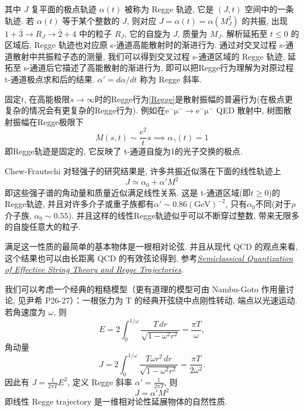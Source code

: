\documentclass[10pt]{article}
\newcounter{ex}[section]\setcounter{ex}{0}
\numberwithin{equation}{section}
\begin{document}
其中 $J$ 复平面的极点轨迹 $\alpha(t)$ 被称为 Regge 轨迹, 它是 $(J,t)$ 空间中的一条轨迹. 若 $\alpha(t)$ 等于某个整数的 $J$, 则对应 $J=\alpha(t)=\alpha(M_{J}^2)$ 的共振, 出现 $1+\bar{3}\longrightarrow R_{J}\longrightarrow \bar{2}+4$ 中的粒子 $R_{J}$, 它的自旋为 $J$, 质量为 $M_{J}$. 解析延拓至 $t\leq 0$ 的区域后, Regge 轨迹也对应原 s-通道高能散射时的渐进行为. 通过对交叉过程 s-通道散射中共振粒子态的测量, 我们可以得到交叉过程 s-通道区域的 Regge 轨迹, 延拓至 s-通道后它描述了高能散射的渐进行为, 即可以把Regge行为理解为对原过程 t-通道极点求和后的结果. $\alpha'=d\alpha /dt$ 称为 Regge 斜率. 

固定$t$, 在高能极限$s\to\infty$时的Regge行为\eqref{Regge}是散射振幅的普遍行为(在极点更复杂的情况会有更复杂的Regge行为). 例如在$\mathrm{e^-\mu^-}\to\mathrm{e^-\mu^-}$ QED 散射中, 树图散射振幅在Regge极限下
\begin{equation}
  M(s,t)\sim \frac{e^2}{t}s \implies \alpha_\gamma(t)=1
\end{equation} 
即Regge轨迹是固定的, 它反映了 t-通道自旋为1的光子交换的极点. 

Chew-Frautschi 对轻强子的研究结果是, 许多共振近似落在下面的线性轨迹上\cite{ChewFrautschi1961}
\begin{equation}
J\simeq \alpha_0+\alpha' M^2
\end{equation}
即这些强子谱的角动量和质量近似满足线性关系. 这是 t-通道区域(即$t\geq 0$)的Regge轨迹, 并且对许多介子或重子族都有$\alpha'\sim 0.86(\mathrm{GeV})^{-2}$, 只有$\alpha_0$不同(对于$\rho$介子族, $\alpha_0\sim 0.55$). 并且这样的线性Regge轨迹似乎可以不断穿过整数, 带来无限多的自旋任意大的粒子.

满足这一性质的最简单的基本物体是一根相对论弦. 并且从现代 QCD 的观点来看, 这个结果也可以由长距离 QCD 的有效弦论得到, 参考\href{https://arxiv.org/pdf/hep-th/0201169}{\textit{Semiclassical Quantization of Effective String Theory and Regge Trajectories}}. 

我们可以考虑一个经典的粗糙模型（更有道理的模型可由 Nambu-Goto 作用量讨论, 见尹希 P26-27）：一根张力为 T 的经典开弦绕中点刚性转动, 端点以光速运动. 若角速度为 $\omega$, 则
\begin{equation}
E=2\int_0^{1/\omega}
\frac{T\,dr}{\sqrt{1-\omega^2r^2}}
=\frac{\pi T}{\omega},
\end{equation}
角动量
\begin{equation}
J
=
2\int_0^{1/\omega}
\frac{T\omega r^2\,dr}{\sqrt{1-\omega^2r^2}}
=
\frac{\pi T}{2\omega^2}.
\end{equation}
因此有 $J=\frac{1}{2\pi T}E^2$, 定义 Regge 斜率 $\alpha'=\frac{1}{2\pi T}$, 则
\begin{equation}
J=\alpha'M^2
\end{equation}
即线性 Regge trajectory 是一维相对论性延展物体的自然性质. 
\end{document}
